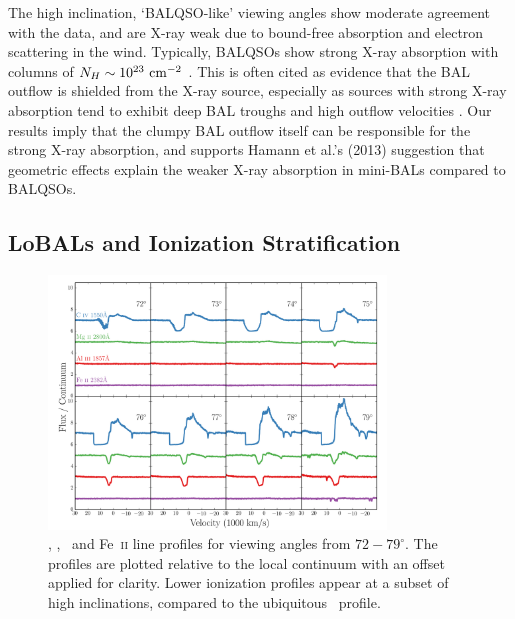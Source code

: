 \documentclass[useAMS,usenatbib]{mn2e_x}
\begin{document}
The high inclination, `BALQSO-like' viewing angles show moderate agreement with the data,
and are X-ray weak due to bound-free absorption and electron scattering in the wind.
Typically, BALQSOs show strong X-ray absorption with columns 
of $N_H\sim10^{23}~\rm{cm^{-2}}$ 
\citep{green1996,mathur2000,green2001,grupemathur2003}.
This is often cited as evidence that the BAL outflow is shielded from
the X-ray source, especially as sources with strong X-ray absorption tend
to exhibit deep BAL troughs and high outflow velocities 
\citep{brandt2000,laorbrandt2002,gallagher2006}.
Our results imply that the clumpy BAL outflow
itself can be responsible for the strong X-ray absorption, 
and supports Hamann et al.'s (2013) suggestion that 
geometric effects explain the weaker X-ray absorption in mini-BALs 
compared to BALQSOs.

\subsection{LoBALs and Ionization Stratification}

\begin{figure}
\centering
\includegraphics[width=0.8\textwidth]{figures/c4_angles.png}
\caption
{
\civ , \mg , \al\ and Fe~\textsc{ii} line profiles for viewing angles
from $72-79^\circ$. The profiles are plotted relative to the local
continuum with an offset applied for clarity. Lower ionization
profiles appear at a subset of high inclinations, compared
to the ubiquitous \civ\ profile.
}
\label{fig:lobal}
\end{figure}
\end{document}
